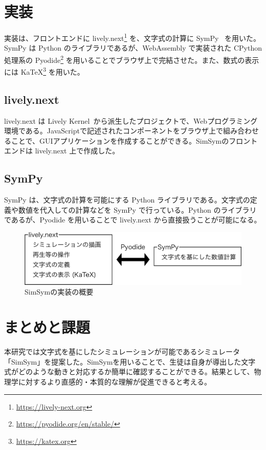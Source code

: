 \documentclass[11pt, a4paper, oneside, twocolumn]{jsarticle}
\newcommand{\simname}{SimSym}
\begin{document}
\section{実装}
実装は、フロントエンドに lively.next\footnote{\url{https://lively-next.org}} を、文字式の計算に SymPy~\cite{meurer_sympy_2017} を用いた。SymPy は Python のライブラリであるが、WebAssembly で実装された CPython 処理系の Pyodide\footnote{\url{https://pyodide.org/en/stable/}} を用いることでブラウザ上で完結させた。また、数式の表示には KaTeX\footnote{\url{https://katex.org}} を用いた。

\subsection*{lively.next}
lively.next は Lively Kernel~\cite{ingalls_2008}から派生したプロジェクトで、Webプログラミング環境である。JavaScriptで記述されたコンポーネントをブラウザ上で組み合わせることで、GUIアプリケーションを作成することができる。\simname のフロントエンドは lively.next 上で作成した。

\subsection*{SymPy}
SymPy は、文字式の計算を可能にする Python ライブラリである。文字式の定義や数値を代入しての計算などを SymPy で行っている。Python のライブラリであるが、Pyodide を用いることで lively.next から直接扱うことが可能になる。

\begin{figure}[hbt]
\centering
\includegraphics*[width=0.9\linewidth]{work/slide_img2-crop.pdf}
\caption{\simname の実装の概要}
\end{figure}

\section{まとめと課題}
本研究では文字式を基にしたシミュレーションが可能であるシミュレータ「\simname」を提案した。\simname を用いることで、生徒は自身が導出した文字式がどのような動きと対応するか簡単に確認することができる。結果として、物理学に対するより直感的・本質的な理解が促進できると考える。
\end{document}
